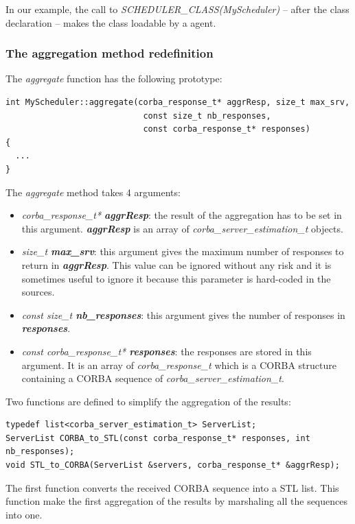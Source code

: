 In our example, the call to \textit{SCHEDULER\_CLASS(MyScheduler)} --
after the class declaration -- makes the class loadable by a \diet agent.

\subsubsection{The aggregation method redefinition}
The \textit{aggregate} function has the following prototype:
\begin{verbatim}
int MyScheduler::aggregate(corba_response_t* aggrResp, size_t max_srv,
                            const size_t nb_responses,
                            const corba_response_t* responses)
{
  ...
}
\end{verbatim}

\noindent The \textit{aggregate} method takes 4 arguments:
\begin{itemize}
  \item \textit{corba\_response\_t* \bf aggrResp}: the result of the aggregation
    has to be set in this argument. \textit{\bf aggrResp} is an array of
    \textit{corba\_server\_estimation\_t} objects. 
  \item \textit{size\_t \bf max\_srv}: this argument gives the maximum number
    of responses to return in \textit{\bf aggrResp}. This value can be ignored
    without any risk and it is sometimes useful to ignore it because this
    parameter is hard-coded in the \diet sources.
  \item \textit{const size\_t \bf nb\_responses}: this argument gives the number
    of responses in \textit{\bf responses}.
  \item \textit{const corba\_response\_t* \bf responses}: the responses are
    stored in this argument. It is an array of \textit{corba\_response\_t}
    which is a CORBA structure containing a CORBA sequence of
    \textit{corba\_server\_estimation\_t}.
\end{itemize}

\noindent Two functions are defined to simplify the aggregation of the results:
\begin{verbatim}
typedef list<corba_server_estimation_t> ServerList;
ServerList CORBA_to_STL(const corba_response_t* responses, int nb_responses);
void STL_to_CORBA(ServerList &servers, corba_response_t* &aggrResp);
\end{verbatim}
The first function converts the received CORBA sequence into a STL list. This
function make the first aggregation of the results by marshaling all the
sequences into one.

